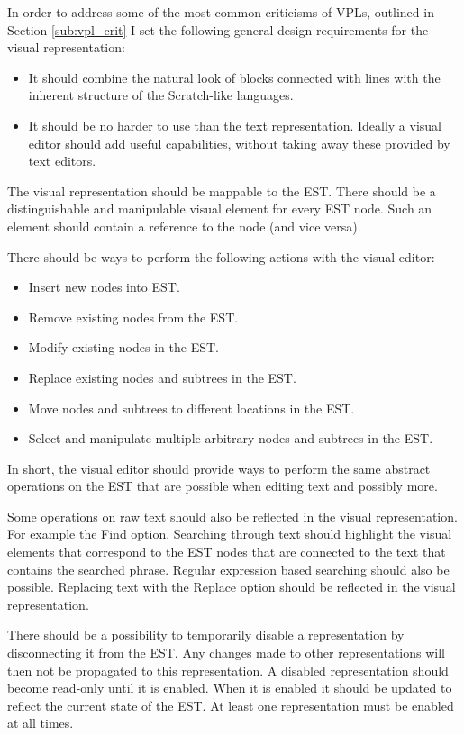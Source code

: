 In order to address some of the most common criticisms of VPLs, outlined in Section \ref{sub:vpl_crit} I set the following general design requirements for the visual representation:
\begin{itemize}
\item It should combine the natural look of blocks connected with lines with the inherent structure of the Scratch-like languages.
\item It should be no harder to use than the text representation. Ideally a visual editor should add useful capabilities, without taking away these provided by text editors.
\end{itemize}


The visual representation should be mappable to the EST. There should be a distinguishable and manipulable visual element for every EST node. Such an element should contain a reference to the node (and vice versa).

There should be ways to perform the following actions with the visual editor:
\begin{itemize}
\item Insert new nodes into EST.
\item Remove existing nodes from the EST.
\item Modify existing nodes in the EST.
\item Replace existing nodes and subtrees in the EST.
\item Move nodes and subtrees to different locations in the EST.
\item Select and manipulate multiple arbitrary nodes and subtrees in the EST.
\end{itemize}

In short, the visual editor should provide ways to perform the same abstract operations on the EST that are possible when editing text and possibly more.

Some operations on raw text should also be reflected in the visual representation. For example the Find option. Searching through text should highlight the visual elements that correspond to the EST nodes that are connected to the text that contains the searched phrase. Regular expression based searching should also be possible. Replacing text with the Replace option should be reflected in the visual representation.

There should be a possibility to temporarily disable a representation by disconnecting it from the EST. Any changes made to other representations will then not be propagated to this representation. A disabled representation should become read-only until it is enabled. When it is enabled it should be updated to reflect the current state of the EST. At least one representation must be enabled at all times.

